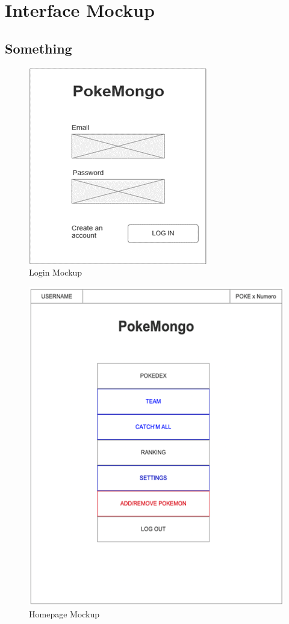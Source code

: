 \section{Interface Mockup}
\subsection{Something}

\begin{figure}[h]
    \centering
    \includegraphics{img/Picture1.png}
    \caption{Login Mockup}
\end{figure}

\begin{figure}[h]
    \centering
    \includegraphics{img/Picture2.png}
    \caption{Homepage Mockup}
\end{figure}

